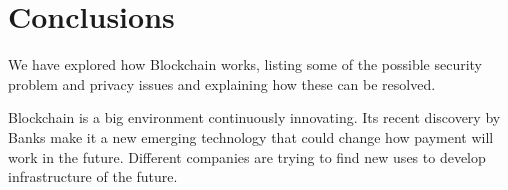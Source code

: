 \section*{Conclusions}

We have explored how Blockchain works, listing some of the possible security
problem and privacy issues and explaining how these can be resolved.

Blockchain is a big environment continuously innovating. Its recent discovery by
Banks make it a new emerging technology that could change how payment will work
in the future. Different companies are trying to find new uses to develop
infrastructure of the future.

